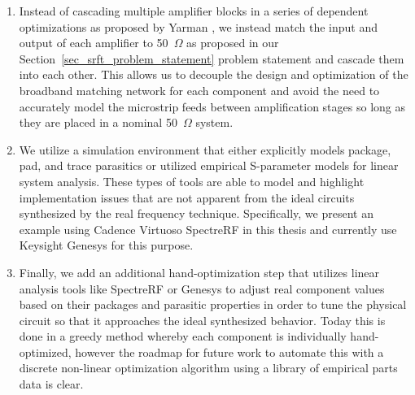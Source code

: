 \begin{enumerate}
	\item Instead of cascading multiple amplifier blocks in a series of dependent optimizations as proposed by Yarman \cite{yarman1982simplified}, we instead match the input and output of each amplifier to 50~$\Omega$ as proposed in our Section~\ref{sec_srft_problem_statement} problem statement and cascade them into each other. This allows us to decouple the design and optimization of the broadband matching network for each component and avoid the need to accurately model the microstrip feeds between amplification stages so long as they are placed in a nominal 50~$\Omega$ system.
	
	\item We utilize a simulation environment that either explicitly models package, pad, and trace parasitics or utilized empirical S-parameter models for linear system analysis. These types of tools are able to model and highlight implementation issues that are not apparent from the ideal circuits synthesized by the real frequency technique. Specifically, we present an example using Cadence Virtuoso SpectreRF in this thesis and currently use Keysight Genesys for this purpose.
	
	\item Finally, we add an additional hand-optimization step that utilizes linear analysis tools like SpectreRF or Genesys to adjust real component values based on their packages and parasitic properties in order to tune the physical circuit so that it approaches the ideal synthesized behavior. Today this is done in a greedy method whereby each component is individually hand-optimized, however the roadmap for future work to automate this with a discrete non-linear optimization algorithm using a library of empirical parts data is clear.
\end{enumerate}